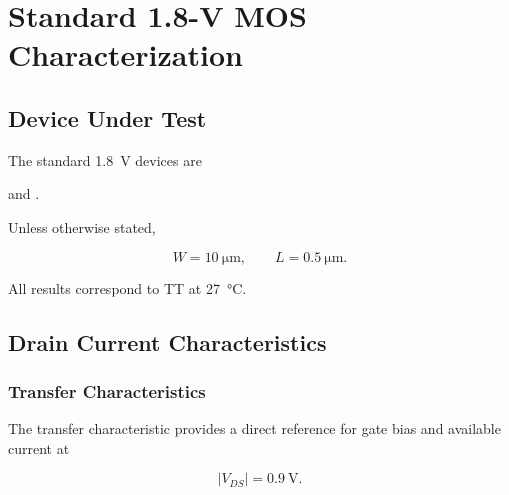
\section{Standard 1.8-V MOS Characterization}
\label{sec:01v8_mos_characterization}



\subsection{Device Under Test}

The standard \qty{1.8}{\volt} devices are

\begin{center}
	\qquad and \qquad
	.
\end{center}

Unless otherwise stated,

\begin{equation}
	W=\qty{10}{\micro\metre},
	\qquad
	L=\qty{0.5}{\micro\metre}.
\end{equation}

All results correspond to TT at \qty{27}{\degreeCelsius}.



\subsection{Drain Current Characteristics}



\subsubsection{Transfer Characteristics}

The transfer characteristic provides a direct reference for gate bias
and available current at

\begin{equation}
	|V_{DS}|=\qty{0.9}{\volt}.
\end{equation}

